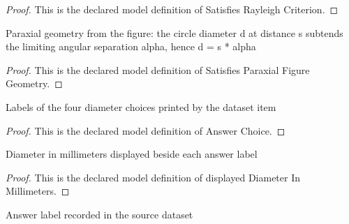 \begin{proof}
  This is the declared model definition of Satisfies Rayleigh Criterion.
\end{proof}
\begin{definition}
  \label{def:physics:phyx-mini-0075:phyxminiproblems-problemphyxmini0075-satisfiesparaxialfiguregeometry}
  Paraxial geometry from the figure: the circle diameter d at distance s subtends the limiting angular separation alpha, hence d = s * alpha
\end{definition}
\begin{proof}
  This is the declared model definition of Satisfies Paraxial Figure Geometry.
\end{proof}
\begin{definition}
  \label{def:physics:phyx-mini-0075:phyxminiproblems-problemphyxmini0075-answerchoice}
  Labels of the four diameter choices printed by the dataset item
\end{definition}
\begin{proof}
  This is the declared model definition of Answer Choice.
\end{proof}
\begin{definition}
  \label{def:physics:phyx-mini-0075:phyxminiproblems-problemphyxmini0075-displayeddiameterinmillimeters}
  Diameter in millimeters displayed beside each answer label
\end{definition}
\begin{proof}
  This is the declared model definition of displayed Diameter In Millimeters.
\end{proof}
\begin{definition}
  \label{def:physics:phyx-mini-0075:phyxminiproblems-problemphyxmini0075-recordeddatasetanswer}
  Answer label recorded in the source dataset
\end{definition}
